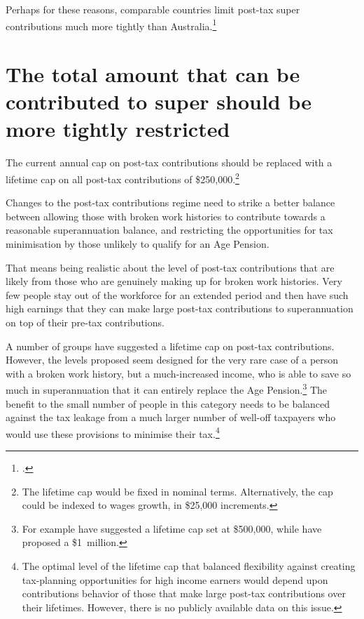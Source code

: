 Perhaps for these reasons, comparable countries limit post-tax super contributions much more tightly than Australia.\footcite[][8]{IndustrySuperAustralia2015-Nearly-half-Australians-not-have-comfortable-retirement}  

\section{The total amount that can be contributed to super should be more tightly restricted}\label{sec:SUPER-5-2}
The current annual cap on post-tax contributions should be replaced with a lifetime cap on all post-tax contributions of \$250,000.\footnote{The lifetime cap would be fixed in nominal terms. Alternatively, the cap could be indexed to wages growth, in \$25,000 increments.}  

Changes to the post-tax contributions regime need to strike a better balance between allowing those with broken work histories to contribute towards a reasonable superannuation balance, and restricting the opportunities for tax minimisation by those unlikely to qualify for an Age Pension.

That means being realistic about the level of post-tax contributions that are likely from those who are genuinely making up for broken work histories. Very few people stay out of the workforce for an extended period and then have such high earnings that they can make large post-tax contributions to superannuation on top of their pre-tax contributions. 

A number of groups have suggested a lifetime cap on post-tax contributions.  However, the levels proposed seem designed for the very rare case of a person with a broken work history, but a much-increased income, who is able to save so much in superannuation that it can entirely replace the Age Pension.\footnote{For example \textcite[][26]{RiceWarner2015SubmissionTaxWhitePaper} have suggested a lifetime cap set at \$500,000, while \textcite[][19]{ASFA2015TreasurySubmission} have proposed a \$1~million.} The benefit to the small number of people in this category needs to be balanced against the tax leakage from a much larger number of well-off taxpayers who would use these provisions to minimise their tax.\footnote{The optimal level of the lifetime cap that balanced flexibility against creating tax-planning opportunities for high income earners would depend upon contributions behavior of those that make large post-tax contributions over their lifetimes. However, there is no publicly available data on this issue.} 

